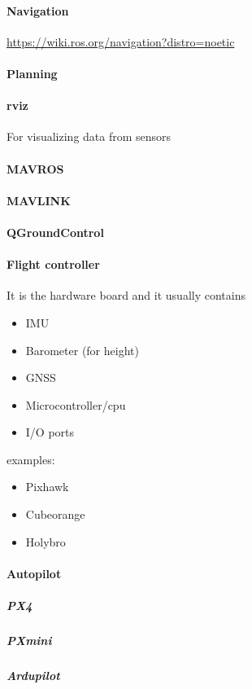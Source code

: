 \documentclass{book}
\begin{document}
\paragraph{Navigation}
    \url{https://wiki.ros.org/navigation?distro=noetic}

\paragraph{Planning}
\paragraph{rviz}
    For visualizing data from sensors
\paragraph{MAVROS}
\paragraph{MAVLINK}
\paragraph{QGroundControl}
\paragraph{Flight controller}
    It is the hardware board and it usually contains
    \begin{itemize}
        \item IMU
        \item Barometer (for height)
        \item GNSS
        \item Microcontroller/cpu
        \item I/O ports
    \end{itemize}

    examples:
    \begin{itemize}
        \item Pixhawk
        \item Cubeorange
        \item Holybro
    \end{itemize}

\paragraph{Autopilot}
    \subparagraph{PX4}
        \subparagraph{PXmini}
    \subparagraph{Ardupilot}
\end{document}
